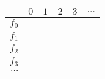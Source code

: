 
\begin{longtable}{|r||r|r|r|r|r|}
\hline 
         & $0$ & $1$ & $2$ & $3$ & $\ldots$ \\ \hline \hline 
$f_0$    &     &     &     &     &          \\ \hline 
$f_1$    &     &     &     &     &          \\ \hline 
$f_2$    &     &     &     &     &          \\ \hline 
$f_3$    &     &     &     &     &          \\ \hline 
$\ldots$ &     &     &     &     &          \\ \hline 
\end{longtable}
        
